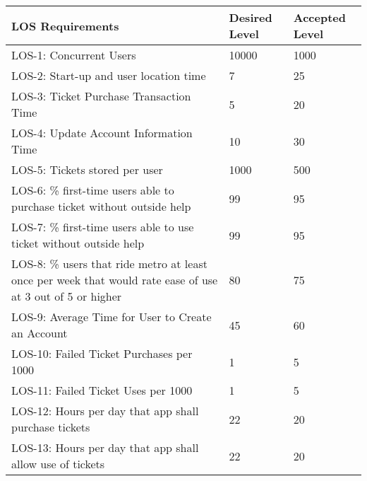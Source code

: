\documentclass[titlepage]{article}
\begin{document}
\begin{table}[h]
    \begin{tabularx}{\textwidth}{Xll}
    \hline
    LOS Requirements                                                                                          & Desired Level & Accepted Level \\ \hline
    LOS-1: Concurrent Users                                                                                   & 10000         & 1000           \\
    LOS-2: Start-up and user location time                                                                    & 7             & 25             \\
    LOS-3: Ticket Purchase Transaction Time                                                                   & 5             & 20             \\
    LOS-4: Update Account Information Time                                                                    & 10            & 30             \\
    LOS-5: Tickets stored per user                                                                            & 1000          & 500            \\
    LOS-6: \% first-time users able to purchase ticket without outside help                                    & 99            & 95             \\
    LOS-7: \% first-time users able to use ticket without outside help                                         & 99            & 95             \\
    LOS-8: \% users that ride metro at least once per week that would rate ease of use at 3 out of 5 or higher & 80            & 75             \\
    LOS-9: Average Time for User to Create an Account                                                         & 45            & 60             \\
    LOS-10: Failed Ticket Purchases per 1000                                                                  & 1             & 5              \\
    LOS-11: Failed Ticket Uses per 1000                                                                       & 1             & 5              \\
    LOS-12: Hours per day that app shall purchase tickets                                                     & 22            & 20             \\
    LOS-13: Hours per day that app shall allow use of tickets                                                 & 22            & 20             \\

\end{tabularx}
\end{table}
\end{document}
